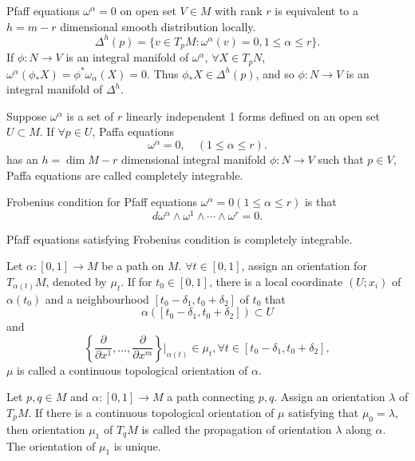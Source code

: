 \begin{newprop}
Pfaff equations $\omega^{\alpha} = 0$ on open set $V \in M$ with rank $r$ is equivalent to a $h=m-r$ dimensional smooth distribution locally.
\[\Delta^h(p) = \{v \in T_pM:\omega^{\alpha}(v)=0,1 \le \alpha \le r \}.\]
If $\phi:N \to V$ is an integral manifold of $\omega^{\alpha}$, $\forall X \in T_pN$, $\omega^{\alpha}(\phi_{*}X) = \phi^* \omega_{\alpha}(X) = 0$. Thus $\phi_* X \in \Delta^h(p)$, and so $\phi:N \to V$ is an integral manifold of $\Delta^h$.
\end{newprop}

\begin{newdef}
Suppose $\omega^{\alpha}$ is a set of $r$ linearly independent 1 forms defined on an open set $U \subset M$. If $\forall p \in U$,  Paffa equations
\[\omega^{\alpha} = 0 , \quad (1 \leq \alpha \leq r).\]
has an $h = \dim M -r$ dimensional integral manifold $\phi: N \to V$ such that $p \in V$, Paffa equations are called completely integrable.
\end{newdef}     

\begin{newdef}
Frobenius condition for Pfaff equations $\omega^{\alpha} =0(1 \le \alpha \le r)$ is that
\[d\omega^{\alpha} \wedge \omega^1 \wedge \cdots \wedge \omega^r = 0.\]
\end{newdef}

\begin{newthem}
Pfaff equations satisfying Frobenius condition is completely integrable.
\end{newthem}

\begin{newdef}
Let $\alpha:[0,1] \to M$ be a path on $M$. $\forall t \in [0,1]$, assign an orientation for $T_{\alpha(t)}M$, denoted by $\mu_t$. If for $t_0 \in [0,1]$, there is a local coordinate $(U;x_i)$ of $\alpha(t_0)$ and a neighbourhood $[t_0-\delta_1,t_0+\delta_2]$ of $t_0$ that
\[\alpha([t_0-\delta_1,t_0+\delta_2]) \subset U\] 
and
\[\left\{ \frac{\partial}{\partial x^1},\ldots,\frac{\partial}{\partial x^m}\right\}|_{\alpha(t)} \in \mu_t,\forall t \in [t_0-\delta_1,t_0+\delta_2],\] 
$\mu$ is called a continuous topological orientation of $\alpha$.
\end{newdef}

\begin{newdef}
Let $p,q \in M$ and $\alpha:[0,1] \to M$ a path connecting $p,q$. Assign an orientation $\lambda$ of $T_pM$. If there is a continuous topological orientation of $\mu$ satisfying that $\mu_0 = \lambda$, then orientation $\mu_1$ of $T_qM$ is called the propagation of orientation $\lambda$ along $\alpha$. The orientation of $\mu_1$ is unique.
\end{newdef}

